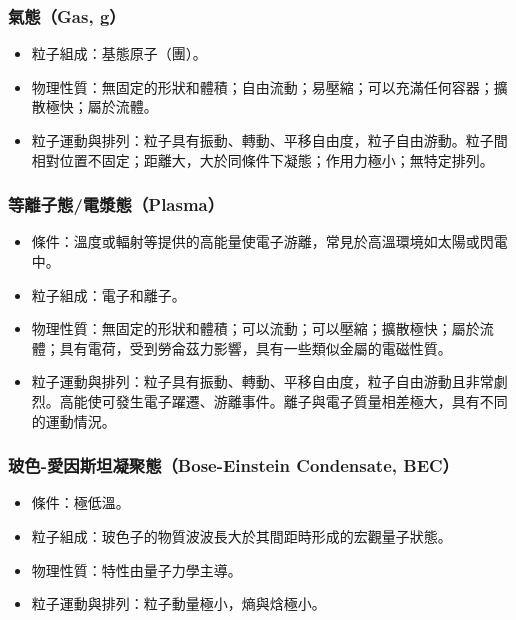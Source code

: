 \documentclass[a4paper,12pt]{report}
\begin{document}
\subsubsection{氣態（Gas, g）}
\begin{itemize}
\item 粒子組成：基態原子（團）。
\item 物理性質：無固定的形狀和體積；自由流動；易壓縮；可以充滿任何容器；擴散極快；屬於流體。
\item 粒子運動與排列：粒子具有振動、轉動、平移自由度，粒子自由游動。粒子間相對位置不固定；距離大，大於同條件下凝態；作用力極小；無特定排列。
\end{itemize}
\subsubsection{等離子態/電漿態（Plasma）}
\begin{itemize}
\item 條件：溫度或輻射等提供的高能量使電子游離，常見於高溫環境如太陽或閃電中。
\item 粒子組成：電子和離子。
\item 物理性質：無固定的形狀和體積；可以流動；可以壓縮；擴散極快；屬於流體；具有電荷，受到勞侖茲力影響，具有一些類似金屬的電磁性質。
\item 粒子運動與排列：粒子具有振動、轉動、平移自由度，粒子自由游動且非常劇烈。高能使可發生電子躍遷、游離事件。離子與電子質量相差極大，具有不同的運動情況。
\end{itemize}
\subsubsection{玻色-愛因斯坦凝聚態（Bose-Einstein Condensate, BEC）}
\begin{itemize}
\item 條件：極低溫。
\item 粒子組成：玻色子的物質波波長大於其間距時形成的宏觀量子狀態。
\item 物理性質：特性由量子力學主導。
\item 粒子運動與排列：粒子動量極小，熵與焓極小。
\end{itemize}
\end{document}
